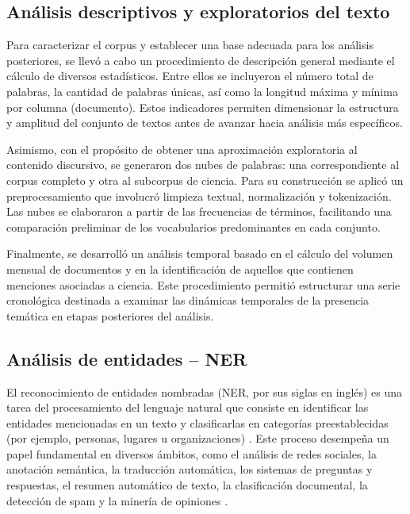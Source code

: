 \documentclass[11pt,a4paper]{article}
\begin{document}
\subsection{Análisis descriptivos y exploratorios del texto}
	
	
	Para caracterizar el corpus y establecer una base adecuada para los análisis posteriores, se llevó a cabo un procedimiento de descripción general mediante el cálculo de diversos estadísticos. Entre ellos se incluyeron el número total de palabras, la cantidad de palabras únicas, así como la longitud máxima y mínima por columna (documento). Estos indicadores permiten dimensionar la estructura y amplitud del conjunto de textos antes de avanzar hacia análisis más específicos.
	
	Asimismo, con el propósito de obtener una aproximación exploratoria al contenido discursivo, se generaron dos nubes de palabras: una correspondiente al corpus completo y otra al subcorpus de ciencia. Para su construcción se aplicó un preprocesamiento que involucró limpieza textual, normalización y tokenización. Las nubes se elaboraron a partir de las frecuencias de términos, facilitando una comparación preliminar de los vocabularios predominantes en cada conjunto.
	
	Finalmente, se desarrolló un análisis temporal basado en el cálculo del volumen mensual de documentos y en la identificación de aquellos que contienen menciones asociadas a ciencia. Este procedimiento permitió estructurar una serie cronológica destinada a examinar las dinámicas temporales de la presencia temática en etapas posteriores del análisis.
	
	
	
	\subsection{Análisis de entidades – NER}
	El reconocimiento de entidades nombradas (NER, por sus siglas en inglés) es una tarea del procesamiento del lenguaje natural que consiste en identificar las entidades mencionadas en un texto y clasificarlas en categorías preestablecidas (por ejemplo, personas, lugares u organizaciones) \cite{Jehangir2023}. Este proceso desempeña un papel fundamental en diversos ámbitos, como el análisis de redes sociales, la anotación semántica, la traducción automática, los sistemas de preguntas y respuestas, el resumen automático de texto, la clasificación documental, la detección de spam y la minería de opiniones \cite{Jehangir2023}.
	
\end{document}
